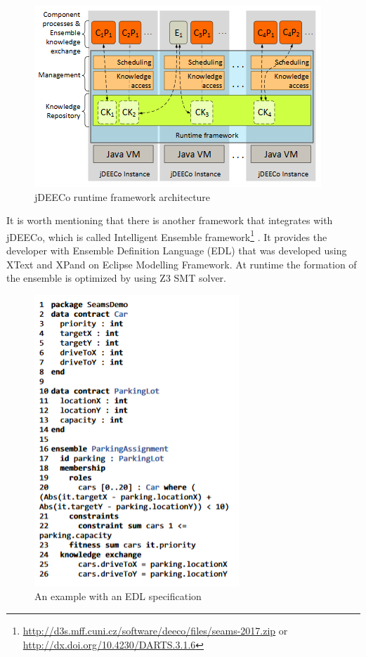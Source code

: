 \begin{figure}[!h]
\centering
\includegraphics[scale=0.85]{figures/jdeeco}
\caption{jDEECo runtime framework architecture}
\label{fig:ros}
\end{figure}

 It is worth mentioning that there is another framework that integrates with jDEECo, which is called Intelligent Ensemble framework\footnote{\url{http://d3s.mff.cuni.cz/software/deeco/files/seams-2017.zip} or \url{http://dx.doi.org/10.4230/DARTS.3.1.6}} \cite{Krijt2017Intelligent}. It provides the developer with Ensemble Definition Language (EDL) that was developed using XText and XPand on Eclipse Modelling Framework. At runtime the formation of the ensemble is optimized by using Z3 SMT solver.  
 
\begin{figure}[!h]
\centering
\includegraphics[scale=0.75]{figures/edlspec}
\caption{An example with an EDL specification}
\label{fig:ros}
\end{figure}


